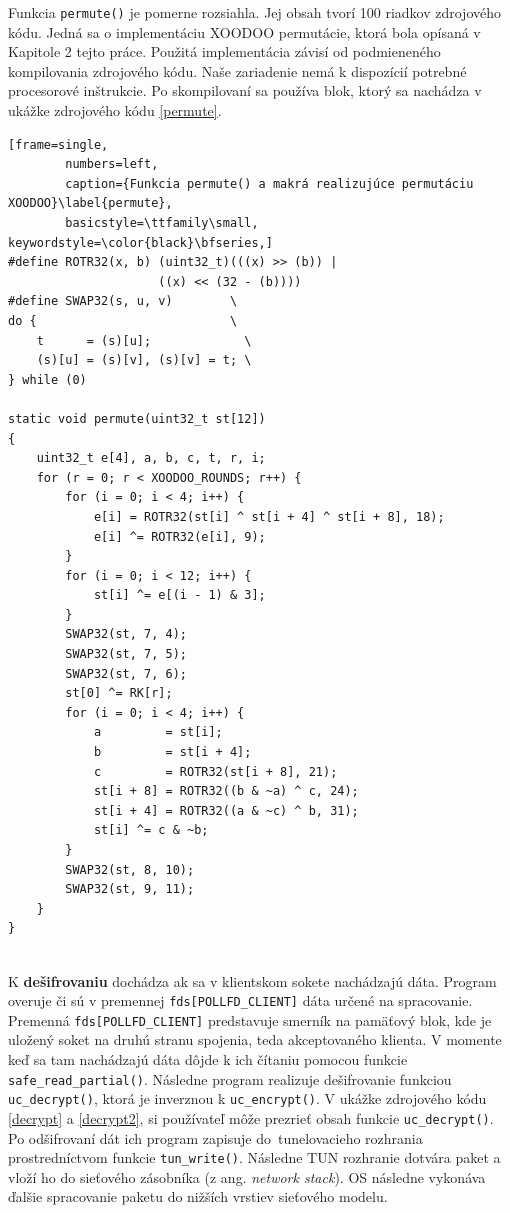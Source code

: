 Funkcia \lstinline|permute()| je pomerne rozsiahla. Jej obsah tvorí 100 riadkov zdrojového kódu. Jedná sa o implementáciu XOODOO permutácie, ktorá bola opísaná v Kapitole 2 tejto práce. Použitá implementácia závisí od podmieneného kompilovania zdrojového kódu. Naše zariadenie nemá k dispozícií potrebné procesorové inštrukcie. Po skompilovaní sa používa blok, ktorý sa nachádza v ukážke zdrojového kódu \ref{permute}.   

\begin{minipage}{\linewidth} 	
	\begin{lstlisting}[frame=single,
		numbers=left,
		caption={Funkcia permute() a makrá realizujúce permutáciu XOODOO}\label{permute},
		basicstyle=\ttfamily\small, keywordstyle=\color{black}\bfseries,]
#define ROTR32(x, b) (uint32_t)(((x) >> (b)) | 
                     ((x) << (32 - (b))))
#define SWAP32(s, u, v)        \
do {                           \
	t      = (s)[u];             \
	(s)[u] = (s)[v], (s)[v] = t; \
} while (0)
	
static void permute(uint32_t st[12])
{
	uint32_t e[4], a, b, c, t, r, i;	
	for (r = 0; r < XOODOO_ROUNDS; r++) {
		for (i = 0; i < 4; i++) {
			e[i] = ROTR32(st[i] ^ st[i + 4] ^ st[i + 8], 18);
			e[i] ^= ROTR32(e[i], 9);
		}
		for (i = 0; i < 12; i++) {
			st[i] ^= e[(i - 1) & 3];
		}
		SWAP32(st, 7, 4);
		SWAP32(st, 7, 5);
		SWAP32(st, 7, 6);
		st[0] ^= RK[r];
		for (i = 0; i < 4; i++) {
			a         = st[i];
			b         = st[i + 4];
			c         = ROTR32(st[i + 8], 21);
			st[i + 8] = ROTR32((b & ~a) ^ c, 24);
			st[i + 4] = ROTR32((a & ~c) ^ b, 31);
			st[i] ^= c & ~b;
		}
		SWAP32(st, 8, 10);
		SWAP32(st, 9, 11);
	}	
}
	\end{lstlisting}
\end{minipage}\\
K \textbf{dešifrovaniu} dochádza ak sa v klientskom sokete nachádzajú dáta. Program overuje či sú v premennej \lstinline|fds[POLLFD_CLIENT]| dáta určené na spracovanie. Premenná \lstinline|fds[POLLFD_CLIENT]| predstavuje smerník na pamäťový blok, kde je uložený soket na druhú stranu spojenia, teda akceptovaného klienta. V momente keď sa tam nachádzajú dáta dôjde k ich čítaniu pomocou funkcie \lstinline|safe_read_partial()|. Následne program realizuje dešifrovanie funkciou \lstinline|uc_decrypt()|, ktorá je inverznou k \lstinline|uc_encrypt()|. V ukážke zdrojového kódu \ref{decrypt} a \ref{decrypt2}, si používateľ môže prezrieť obsah funkcie \lstinline|uc_decrypt()|. Po odšifrovaní dát ich program zapisuje do~tunelovacieho rozhrania prostredníctvom funkcie \lstinline|tun_write()|. Následne TUN rozhranie dotvára paket a vloží ho do sieťového zásobníka (z ang. \textit{network stack}). OS následne vykonáva ďalšie spracovanie paketu do nižších vrstiev sieťového modelu. 

